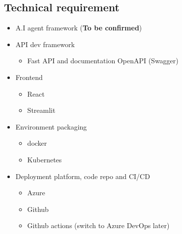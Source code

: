 \documentclass{article}
\begin{document}
\subsection{Technical requirement}
    \begin{itemize}
        \item A.I agent framework (\textbf{To be confirmed})
        \item API dev framework
        \begin{itemize}
            \item Fast API and documentation OpenAPI (Swagger)
        \end{itemize}
        \item Frontend 
        \begin{itemize}
            \item React
            \item Streamlit
        \end{itemize}
        \item Environment packaging 
        \begin{itemize}
            \item docker
            \item Kubernetes
        \end{itemize}
        \item Deployment platform, code repo and CI/CD
        \begin{itemize}
            \item Azure
            \item Github
            \item Github actions  (switch to Azure DevOps later)
    \end{itemize}
 \end{itemize}
\end{document}
